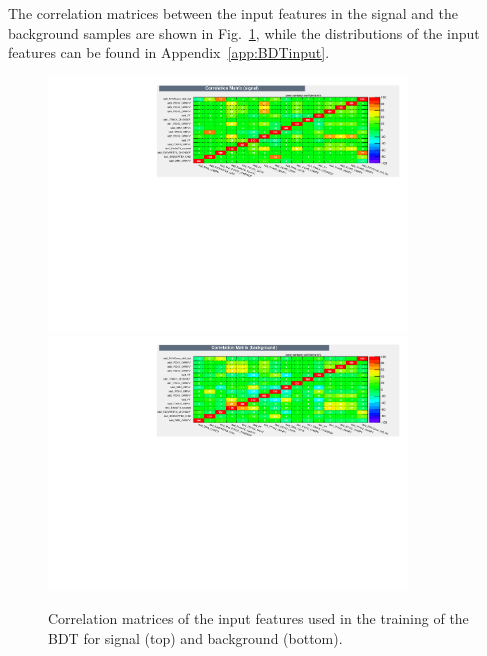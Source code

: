 %
The correlation matrices
between the input features in the signal and the background samples are shown in Fig.~\ref{fig:BDTcorrelation}, while the distributions of the input features 
can be found in Appendix~\ref{app:BDTinput}.
%
\begin{figure}[t]
	\begin{center}
		\includegraphics[width=0.85\textwidth]{02Selection/figs/CorrelationMatrixS.pdf}\\
		\includegraphics[width=0.85\textwidth]{02Selection/figs/CorrelationMatrixB.pdf}
	\end{center}
        \vspace{-2mm}
	\caption{Correlation matrices of the input features used in the training of the
	BDT for signal (top) and background (bottom).}
	\label{fig:BDTcorrelation}
\end{figure}
%

